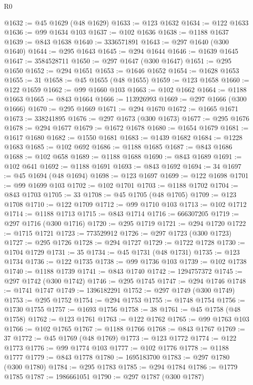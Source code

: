 \begin{lexlean}{R0}
\begin{coremodule}
@1632 := @45 @1629 (@48 @1629)
@1633 := @123 @1632
@1634 := @122 @1633
@1636 := @99 @1634 @103
@1637 := @102 @1636
@1638 := @1188 @1637
@1639 := @843 @1638
@1640 := 3336571891
@1643 := @297 @1640 (@300 @1640)
@1644 := @295 @1643
@1645 := @294 @1644
@1646 := @1639 @1645
@1647 := 3584528711
@1650 := @297 @1647 (@300 @1647)
@1651 := @295 @1650
@1652 := @294 @1651
@1653 := @1646 @1652
@1654 := @1628 @1653
@1655 := 31
@1658 := @45 @1655 (@48 @1655)
@1659 := @123 @1658
@1660 := @122 @1659
@1662 := @99 @1660 @103
@1663 := @102 @1662
@1664 := @1188 @1663
@1665 := @843 @1664
@1666 := 113926993
@1669 := @297 @1666 (@300 @1666)
@1670 := @295 @1669
@1671 := @294 @1670
@1672 := @1665 @1671
@1673 := 338241895
@1676 := @297 @1673 (@300 @1673)
@1677 := @295 @1676
@1678 := @294 @1677
@1679 := @1672 @1678
@1680 := @1654 @1679
@1681 := @1617 @1680
@1682 := @1550 @1681
@1683 := @1439 @1682
@1684 := @1228 @1683
@1685 := @102 @692
@1686 := @1188 @1685
@1687 := @843 @1686
@1688 := @102 @658
@1689 := @1188 @1688
@1690 := @843 @1689
@1691 := @102 @641
@1692 := @1188 @1691
@1693 := @843 @1692
@1694 := 34
@1697 := @45 @1694 (@48 @1694)
@1698 := @123 @1697
@1699 := @122 @1698
@1701 := @99 @1699 @103
@1702 := @102 @1701
@1703 := @1188 @1702
@1704 := @843 @1703
@1705 := 33
@1708 := @45 @1705 (@48 @1705)
@1709 := @123 @1708
@1710 := @122 @1709
@1712 := @99 @1710 @103
@1713 := @102 @1712
@1714 := @1188 @1713
@1715 := @843 @1714
@1716 := 666307205
@1719 := @297 @1716 (@300 @1716)
@1720 := @295 @1719
@1721 := @294 @1720
@1722 := @1715 @1721
@1723 := 773529912
@1726 := @297 @1723 (@300 @1723)
@1727 := @295 @1726
@1728 := @294 @1727
@1729 := @1722 @1728
@1730 := @1704 @1729
@1731 := 35
@1734 := @45 @1731 (@48 @1731)
@1735 := @123 @1734
@1736 := @122 @1735
@1738 := @99 @1736 @103
@1739 := @102 @1738
@1740 := @1188 @1739
@1741 := @843 @1740
@1742 := 1294757372
@1745 := @297 @1742 (@300 @1742)
@1746 := @295 @1745
@1747 := @294 @1746
@1748 := @1741 @1747
@1749 := 1396182291
@1752 := @297 @1749 (@300 @1749)
@1753 := @295 @1752
@1754 := @294 @1753
@1755 := @1748 @1754
@1756 := @1730 @1755
@1757 := @1693 @1756
@1758 := 38
@1761 := @45 @1758 (@48 @1758)
@1762 := @123 @1761
@1763 := @122 @1762
@1765 := @99 @1763 @103
@1766 := @102 @1765
@1767 := @1188 @1766
@1768 := @843 @1767
@1769 := 37
@1772 := @45 @1769 (@48 @1769)
@1773 := @123 @1772
@1774 := @122 @1773
@1776 := @99 @1774 @103
@1777 := @102 @1776
@1778 := @1188 @1777
@1779 := @843 @1778
@1780 := 1695183700
@1783 := @297 @1780 (@300 @1780)
@1784 := @295 @1783
@1785 := @294 @1784
@1786 := @1779 @1785
@1787 := 1986661051
@1790 := @297 @1787 (@300 @1787)

\end{coremodule}
\end{lexlean}
